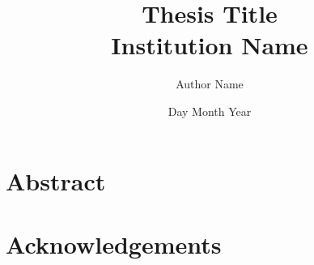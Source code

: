 \documentclass[12pt,a4paper]{report}
\makeatletter
\numberwithin{equation}{section}       %
\let\org@subfile
\renewcommand*{}[1]{%
  \filename@parse{#1}%
  \expandafter
  \graphicspath\expandafter{\expandafter{\filename@area}}%
  \org@subfile{#1}%
}
\makeatother
\begin{document}
  \title{
    {Thesis Title}\\
    {\large Institution Name}\\
  }
  \author{Author Name}
  \date{Day Month Year}
  \maketitle

  \newpage
  \chapter*{Abstract}


  \chapter*{Acknowledgements}

  
  
  
  
  

  \printbibliography
  \printnomenclature
\end{document}
